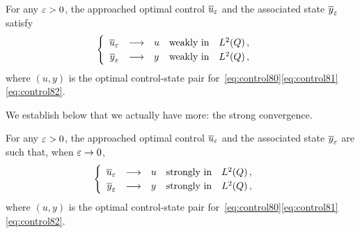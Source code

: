 \begin{proposition}%
    For any $\varepsilon > 0$, the approached optimal control ${\overline{u}}_{\varepsilon}$ and
    the associated state ${\overline{y}}_{\varepsilon}$ satisfy
    \begin{equation*}
        \begin{cases}\displaystyle
            \begin{array}{rclll}
                {\overline{u}}_{\varepsilon} & \longrightarrow & u & \text{weakly in} &
                L^{2}\!\left({Q}\right),\\
                {\overline{y}}_{\varepsilon} & \longrightarrow & y & \text{weakly in} &
                L^{2}\!\left({Q}\right),
            \end{array}
        \end{cases}
    \end{equation*}
    where $(u,y)$ is the optimal control-state pair
    for~\eqref{eq:control80}\eqref{eq:control81}\eqref{eq:control82}.
\end{proposition}

We establish below that we actually have more: the strong convergence.

\begin{theoreme}%
    For any $\varepsilon > 0$, the approached optimal control ${\overline{u}}_{\varepsilon}$ and
    the associated state ${\overline{y}}_{\varepsilon}$ are such that, when $\varepsilon \to 0$,
    \begin{equation*}
        \begin{cases}\displaystyle
            \begin{array}{rclll}
                {\overline{u}}_{\varepsilon} & \longrightarrow & u & \text{strongly in} &
                L^{2}\!\left({Q}\right),\\
                {\overline{y}}_{\varepsilon} & \longrightarrow & y & \text{strongly in} &
                L^{2}\!\left({Q}\right),
            \end{array}
        \end{cases}
    \end{equation*}
    where $(u,y)$ is the optimal control-state pair
    for~\eqref{eq:control80}\eqref{eq:control81}\eqref{eq:control82}.
\end{theoreme}

